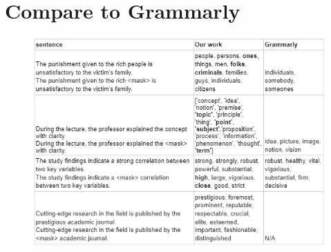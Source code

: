 \documentclass[12pt,oneside,openright,a4paper]{cpe-english-project}
\begin{document}
\section{Compare to Grammarly}
\begin{figure}[!h]\centering
\includegraphics[width=15cm]{./img/Appendix/Grammarly.png}
\end{figure}

\newpage
\end{document}
